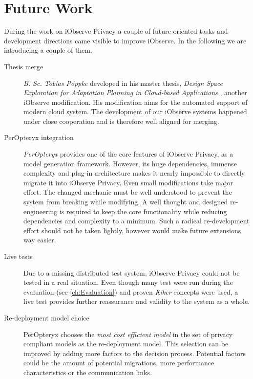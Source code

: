 \section{Future Work}
\label{sec:Conculsion:future}

During the work on iObserve Privacy a couple of future oriented tasks and development directions came visible to improve iObserve. In the following we are introducing a couple of them.

\begin{description}
	\item[Thesis merge]
	\textit{B. Sc. Tobias Pöppke} developed in his master thesis, \textit{Design Space Exploration for Adaptation Planning in Cloud-based Applications} \cite{TobiasPoppke.20170626}, another iObserve modification. His modification aims for the automated support of modern cloud system. The development of our iObserve systems happened under close cooperation and is therefore well aligned for merging.
\end{description}

\begin{description}
	\item[PerOpteryx integration]
	\textit{PerOpteryx} provides one of the core features of iObserve Privacy, as a model generation framework. However, its huge dependencies, immense complexity and plug-in architecture makes it nearly impossible to directly migrate it into iObserve Privacy. Even small modifications take major effort. The changed mechanic must be well understood to prevent the system from breaking while modifying. A well thought and designed re-engineering is required to keep the core functionality while reducing dependencies and complexity to a minimum. Such a radical re-development effort should not be taken lightly, however would make future extensions way easier.
\end{description}

\begin{description}
	\item[Live tests]
	Due to a missing distributed test system, iObserve Privacy could not be tested in a real situation. Even though many test were run during the evaluation (see \autoref{ch:Evaluation}) and proven \textit{Kiker} concepts were used, a live test provides further reassurance and validity to the system as a whole. 
\end{description}

\begin{description}
	\item[Re-deployment model choice]
	PerOpteryx chooses the \textit{most cost efficient model} in the set of privacy compliant models as the re-deployment model. This selection can be improved by adding more factors to the decision process. Potential factors could be the amount of potential migrations, more performance characteristics or the communication links.
\end{description}


